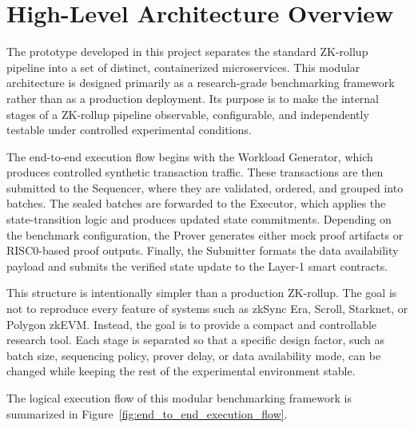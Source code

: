 
\section{High-Level Architecture Overview}
\label{sec:architecture_overview}

The prototype developed in this project separates the standard ZK-rollup pipeline into a set of distinct, containerized microservices. This modular architecture is designed primarily as a research-grade benchmarking framework rather than as a production deployment. Its purpose is to make the internal stages of a ZK-rollup pipeline observable, configurable, and independently testable under controlled experimental conditions.

The end-to-end execution flow begins with the Workload Generator, which produces controlled synthetic transaction traffic. These transactions are then submitted to the Sequencer, where they are validated, ordered, and grouped into batches. The sealed batches are forwarded to the Executor, which applies the state-transition logic and produces updated state commitments. Depending on the benchmark configuration, the Prover generates either mock proof artifacts or RISC0-based proof outputs. Finally, the Submitter formats the data availability payload and submits the verified state update to the Layer-1 smart contracts.

This structure is intentionally simpler than a production ZK-rollup. The goal is not to reproduce every feature of systems such as zkSync Era, Scroll, Starknet, or Polygon zkEVM. Instead, the goal is to provide a compact and controllable research tool. Each stage is separated so that a specific design factor, such as batch size, sequencing policy, prover delay, or data availability mode, can be changed while keeping the rest of the experimental environment stable.

The logical execution flow of this modular benchmarking framework is summarized in Figure~\ref{fig:end_to_end_execution_flow}.

